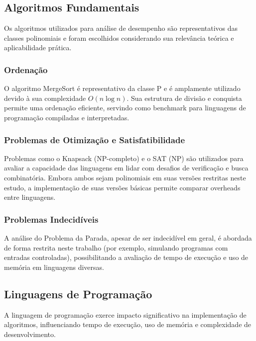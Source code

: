 \documentclass[12pt, a4paper]{article}
\begin{document}
\subsection{Algoritmos Fundamentais}

Os algoritmos utilizados para análise de desempenho são representativos das classes polinomiais e foram escolhidos considerando sua relevância teórica e aplicabilidade prática.

\subsubsection{Ordenação}

O algoritmo MergeSort é representativo da classe P e é amplamente utilizado devido à sua complexidade \( O(n \log n) \). Sua estrutura de divisão e conquista permite uma ordenação eficiente, servindo como benchmark para linguagens de programação compiladas e interpretadas.

\subsubsection{Problemas de Otimização e Satisfatibilidade}

Problemas como o Knapsack (NP-completo) e o SAT (NP) são utilizados para avaliar a capacidade das linguagens em lidar com desafios de verificação e busca combinatória. Embora ambos sejam polinomiais em suas versões restritas neste estudo, a implementação de suas versões básicas permite comparar overheads entre linguagens.

\subsubsection{Problemas Indecidíveis}

A análise do Problema da Parada, apesar de ser indecidível em geral, é abordada de forma restrita neste trabalho (por exemplo, simulando programas com entradas controladas), possibilitando a avaliação de tempo de execução e uso de memória em linguagens diversas.

\subsection{Linguagens de Programação}

A linguagem de programação exerce impacto significativo na implementação de algoritmos, influenciando tempo de execução, uso de memória e complexidade de desenvolvimento.
\end{document}

